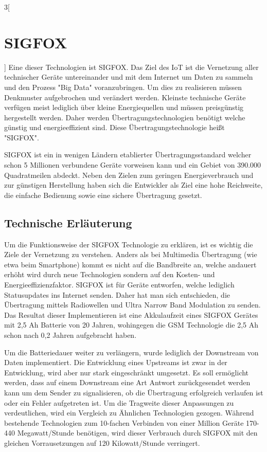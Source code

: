 \begin{multicols}{3}[\section{SIGFOX}]
Eine dieser Technologien ist SIGFOX. Das Ziel des IoT ist die Vernetzung aller technischer Geräte untereinander und mit dem Internet um Daten zu sammeln und den Prozess "Big Data" voranzubringen. Um dies zu realisieren müssen Denkmuster aufgebrochen und verändert werden. Kleinste technische Geräte verfügen meist lediglich über kleine Energiequellen und müssen preisgünstig hergestellt werden. Daher werden Übertragungstechnologien benötigt welche günstig und energieeffizient sind. Diese Übertragungstechnologie heißt "SIGFOX".~\cite{sigfox.2}

SIGFOX ist ein in wenigen Ländern etablierter Übertragungsstandard welcher schon 5 Millionen verbundene Geräte vorweisen kann und ein Gebiet von 390.000 Quadratmeilen abdeckt. Neben den Zielen zum geringen Energieverbrauch und zur günstigen Herstellung haben sich die Entwickler als Ziel eine hohe Reichweite, die einfache Bedienung sowie eine sichere Übertragung gesetzt.~\cite{sigfox.2}


\subsection*{Technische Erläuterung}
Um die Funktionsweise der SIGFOX Technologie zu erklären, ist es wichtig die Ziele der Vernetzung zu verstehen. Anders als bei Multimedia Übertragung (wie etwa beim Smartphone) kommt es nicht auf die Bandbreite an, welche andauert erhöht wird durch neue Technologien sondern auf den Kosten- und Energieeffizienzfaktor. SIGFOX ist für Geräte entworfen, welche lediglich Statusupdates ins Internet senden. Daher hat man sich entschieden, die Übertragung mittels Radiowellen und Ultra Narrow Band Modulation zu senden. Das Resultat dieser Implementieren ist eine Akkulaufzeit eines SIGFOX Gerätes mit 2,5 Ah Batterie von 20 Jahren, wohingegen die GSM Technologie die 2,5 Ah schon nach 0,2 Jahren aufgebracht haben.~\cite{sigfox.3}

Um die Batteriedauer weiter zu verlängern, wurde lediglich der Downstream von Daten implementiert. Die Entwicklung eines Upstreams ist zwar in der Entwicklung, wird aber nur stark eingeschränkt umgesetzt. Es soll ermöglicht werden, dass auf einem Downstream eine Art Antwort zurückgesendet werden kann um dem Sender zu signalisieren, ob die Übertragung erfolgreich verlaufen ist oder ein Fehler aufgetreten ist. Um die Tragweite dieser Anpassungen zu verdeutlichen, wird ein Vergleich zu Ähnlichen Technologien gezogen. Während bestehende Technologien zum 10-fachen Verbinden von einer Million Geräte 170-440 Megawatt/Stunde benötigen, wird dieser Verbrauch durch SIGFOX mit den gleichen Vorrausetzungen auf 120 Kilowatt/Stunde verringert.~\cite{sigfox.3}


\end{multicols}
